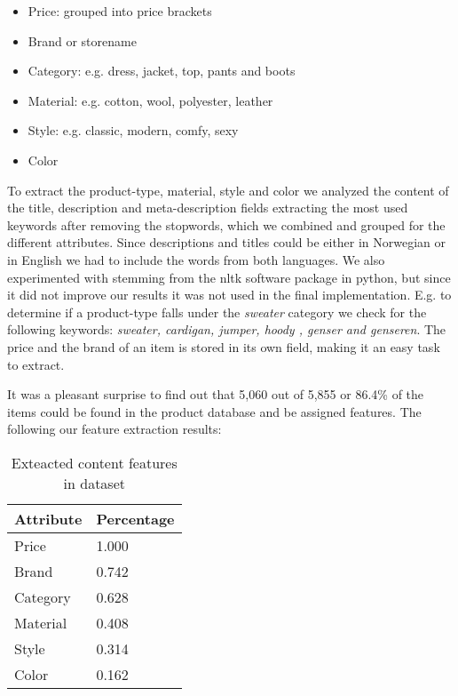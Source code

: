 \begin{itemize}
\item Price: grouped into price brackets
\item Brand or storename
\item Category: e.g. dress, jacket, top, pants and boots
\item Material: e.g. cotton, wool, polyester, leather
\item Style: e.g. classic, modern, comfy, sexy
\item Color
\end{itemize}

To extract the product-type, material, style and color we analyzed the content of the title, description and meta-description
fields extracting the most used keywords after removing the stopwords, which we combined and grouped for the different
attributes. Since descriptions and titles could be either in Norwegian or in English we had to include the words from
both languages. We also experimented with stemming from the nltk software package in python, but since it did not
improve our results it was not used in the final implementation. E.g. to determine if a product-type falls under
the \emph{sweater} category we check for the following keywords: \emph{sweater, cardigan, jumper, hoody , genser and genseren}.
The price and the brand of an item is stored in its own field, making it an easy task to extract. \newline

It was a pleasant surprise to find out that 5,060 out of 5,855 or 86.4\% of the items could be found in the
product database and be assigned features. The following our feature extraction results:

\begin{table}[H]
	\centering
	\begin{tabular}{l l}
	\toprule
	Attribute & Percentage  \\ \midrule
	Price 			& 1.000 \\
	Brand 			& 0.742 \\
	Category 		& 0.628 \\
	Material 		& 0.408 \\
	Style 			& 0.314 \\
	Color 			& 0.162 \\
	\bottomrule
	\end{tabular}
    \caption[Extracted content features]{Exteacted content features in dataset}
	\label{table:extracted-content-features}
\end{table}

